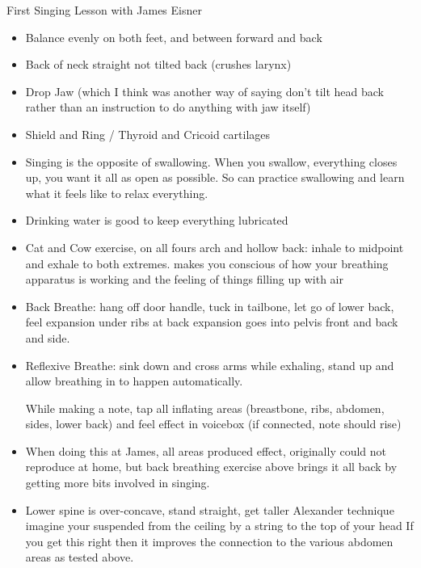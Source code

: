 \documentclass[10pt,a4paper]{memoir}
\begin{document}
First Singing Lesson with James Eisner

\begin{itemize}
\item Balance evenly on both feet, and between forward and back

\item Back of neck straight not tilted back (crushes larynx)

\item Drop Jaw (which I think was another way of saying don't tilt head back rather than an instruction to do anything with jaw itself)

\item Shield and Ring / Thyroid and Cricoid cartilages

\item Singing is the opposite of swallowing. When you swallow, everything closes up, you want it all as open as possible.
So can practice swallowing and learn what it feels like to relax everything.

\item Drinking water is good to keep everything lubricated

\item Cat and Cow exercise, on all fours arch and hollow back: inhale to midpoint and exhale to both extremes.
makes you conscious of how your breathing apparatus is working and the feeling of things filling up with air

\item Back Breathe: hang off door handle, tuck in tailbone, let go of lower back, feel expansion under ribs at back
expansion goes into pelvis front and back and side. 

\item Reflexive Breathe: sink down and cross arms while exhaling, stand up and allow breathing in to happen automatically.

While making a note, tap all inflating areas (breastbone, ribs, abdomen, sides, lower back) and feel effect in voicebox (if connected, note should rise)
\item When doing this at James, all areas produced effect, originally could not reproduce at home, but back breathing exercise above brings it all back by getting more bits involved in singing.

\item Lower spine is over-concave, stand straight, get taller
Alexander technique imagine your suspended from the ceiling by a string to the top of your head
If you get this right then it improves the connection to the various abdomen areas as tested above.


\end{itemize}
\end{document}
